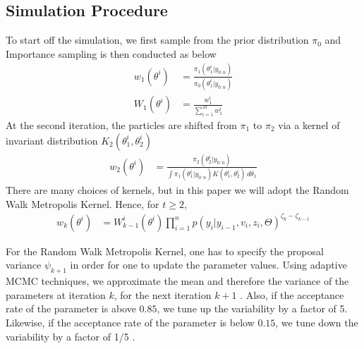 \documentclass[12pt]{article}
\theoremstyle{definition}
\begin{document}
\subsection{Simulation Procedure}
To start off the simulation, we first sample from the prior distribution $\pi_{0}$ and Importance sampling is then conducted as below
\begin{equation}
	\begin{aligned}
		w_{1}(\theta^{i}) &= \frac{\pi_{1}(\theta_{1}^{i}|y_{0:n})}{\pi_{0}(\theta_{1}^{i}|y_{0:n})} \\
		W_{1}(\theta^{i}) &= \frac{w_{1}^{i}}{\sum_{i=1}^{M} w_{1}^{i}}
	\end{aligned}
\end{equation}
At the second iteration, the particles are shifted from $\pi_{1}$ to $\pi_{2}$ via a kernel of invariant distribution $K_{2}(\theta_{1}^{i},\theta_{2}^{i})$
\begin{equation}
	\begin{aligned}
		w_{2}(\theta^{i}) &= \frac{\pi_{2}(\theta_{2}^{i}|y_{0:n})}{\int \pi_{1}(\theta_{1}^{i}|y_{0:n})K(\theta_{1}^{i},\theta_{2}^{i}) \,d\theta_{1}}
	\end{aligned}
\end{equation}
There are many choices of kernels, but in this paper we will adopt the Random Walk Metropolis Kernel. Hence, for $t\geqslant2$,
\begin{equation}
	\begin{aligned}
		w_{k}(\theta^{i}) &= W_{k-1}^{i}(\theta^{i})\prod_{i=1}^{n} p(y_{i}|y_{i-1},v_{i},z_{i},\Theta)^{\zeta_{k}-\zeta_{k-1}}
	\end{aligned}
\end{equation}

\noindent For the Random Walk Metropolis Kernel, one has to specify the proposal variance $\psi_{k+1}$ in order for one to update the parameter values. Using adaptive MCMC techniques, we approximate the mean and therefore the variance of the parameters at iteration $k$, for the next iteration $k+1$ \citep{andrieu2006ergodicity}. Also, if the acceptance rate of the parameter is above $0.85$, we tune up the variability by a factor of 5. Likewise, if the acceptance rate of the parameter is below $0.15$, we tune down the variability by a factor of 1/5 \citep{jasra2011inference}. 
\end{document}
